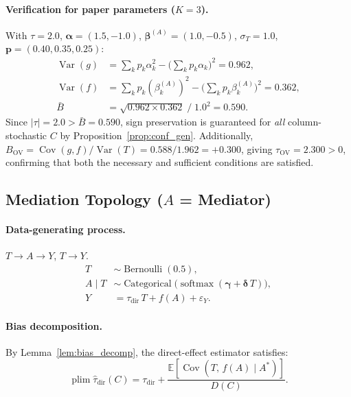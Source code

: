 \paragraph{Verification for paper parameters ($K{=}3$).}
With $\tau{=}2.0$, $\boldsymbol{\alpha}{=}(1.5,{-}1.0)$, $\boldsymbol{\beta}^{(A)}{=}(1.0,{-}0.5)$, $\sigma_T{=}1.0$, $\mathbf{p}{=}(0.40,0.35,0.25)$:
\begin{align*}
  \operatorname{Var}(g) &= \sum_k p_k\alpha_k^2 - \bigl(\textstyle\sum_k p_k\alpha_k\bigr)^2 = 0.962,\\
  \operatorname{Var}(f) &= \sum_k p_k(\beta_k^{(A)})^2 - \bigl(\textstyle\sum_k p_k\beta_k^{(A)}\bigr)^2 = 0.362,\\
  \bar{B} &= \sqrt{0.962\times 0.362}\;/\;1.0^2 = 0.590.
\end{align*}
Since $|\tau|{=}2.0 > \bar{B}{=}0.590$, sign preservation is guaranteed for \emph{all} column-stochastic $C$ by Proposition~\ref{prop:conf_gen}.
Additionally, $B_{\mathrm{OV}}=\operatorname{Cov}(g,f)/\operatorname{Var}(T)=0.588/1.962={+}0.300$, giving $\tau_{\mathrm{OV}}{=}2.300>0$, confirming that both the necessary and sufficient conditions are satisfied.

\subsection{Mediation Topology ($A$ = Mediator)}
\label{app:mediation}

\paragraph{Data-generating process.}
$T\to A\to Y$, $T\to Y$.
\begin{align*}
  T &\sim \operatorname{Bernoulli}(0.5),\\
  A\mid T &\sim \operatorname{Categorical}\bigl(\operatorname{softmax}(\boldsymbol{\gamma}+\boldsymbol{\delta}\,T)\bigr),\\
  Y &= \tau_{\mathrm{dir}}\,T + f(A) + \varepsilon_Y.
\end{align*}

\paragraph{Bias decomposition.}
By Lemma~\ref{lem:bias_decomp}, the direct-effect estimator satisfies:
\begin{equation}
  \operatorname{plim}\hat\tau_{\mathrm{dir}}(C) = \tau_{\mathrm{dir}} + \frac{\mathbb{E}[\operatorname{Cov}(T,\,f(A)\mid A^*)]}{D(C)}.
  \label{eq:med_bias}
\end{equation}

